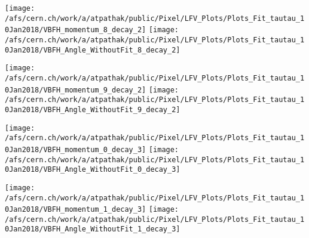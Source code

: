 \documentclass{beamer}
\begin{document}
\begin{frame}
\begin{normalsize}
\begin{center}
\texttt{[image: /afs/cern.ch/work/a/atpathak/public/Pixel/LFV\_Plots/Plots\_Fit\_tautau\_10Jan2018/VBFH\_momentum\_8\_decay\_2]}
\texttt{[image: /afs/cern.ch/work/a/atpathak/public/Pixel/LFV\_Plots/Plots\_Fit\_tautau\_10Jan2018/VBFH\_Angle\_WithoutFit\_8\_decay\_2]} 
\end{center}
\end{normalsize}
\end {frame}
\begin{frame}
\begin{normalsize}
\begin{center}
\texttt{[image: /afs/cern.ch/work/a/atpathak/public/Pixel/LFV\_Plots/Plots\_Fit\_tautau\_10Jan2018/VBFH\_momentum\_9\_decay\_2]}
\texttt{[image: /afs/cern.ch/work/a/atpathak/public/Pixel/LFV\_Plots/Plots\_Fit\_tautau\_10Jan2018/VBFH\_Angle\_WithoutFit\_9\_decay\_2]} 
\end{center}
\end{normalsize}
\end {frame}
\begin{frame}
\begin{normalsize}
\begin{center}
\texttt{[image: /afs/cern.ch/work/a/atpathak/public/Pixel/LFV\_Plots/Plots\_Fit\_tautau\_10Jan2018/VBFH\_momentum\_0\_decay\_3]}
\texttt{[image: /afs/cern.ch/work/a/atpathak/public/Pixel/LFV\_Plots/Plots\_Fit\_tautau\_10Jan2018/VBFH\_Angle\_WithoutFit\_0\_decay\_3]} 
\end{center}
\end{normalsize}
\end {frame}
\begin{frame}
\begin{normalsize}
\begin{center}
\texttt{[image: /afs/cern.ch/work/a/atpathak/public/Pixel/LFV\_Plots/Plots\_Fit\_tautau\_10Jan2018/VBFH\_momentum\_1\_decay\_3]}
\texttt{[image: /afs/cern.ch/work/a/atpathak/public/Pixel/LFV\_Plots/Plots\_Fit\_tautau\_10Jan2018/VBFH\_Angle\_WithoutFit\_1\_decay\_3]} 
\end{center}
\end{normalsize}
\end {frame}
\end{document}
